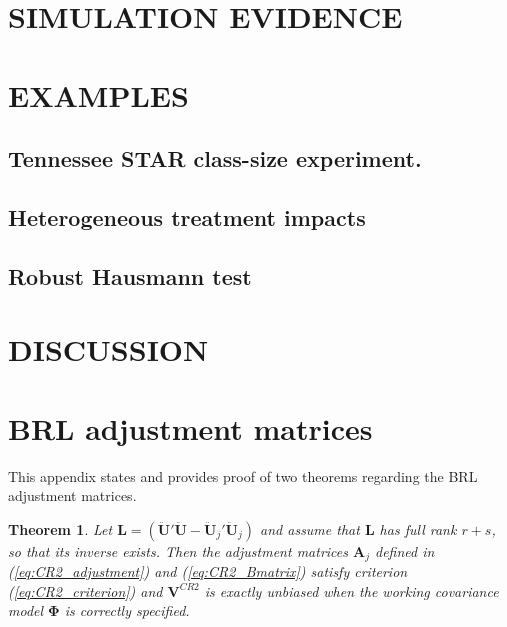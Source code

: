 \documentclass[12pt]{article}\usepackage[]{graphicx}\usepackage[]{color}
\newtheorem{thm}{Theorem}
\newcommand{\bm}{\mathbf}
\newcommand{\bs}{\boldsymbol}
\begin{document}
\section{SIMULATION EVIDENCE}
\label{subsec:simulations}

\section{EXAMPLES}
\label{subsec:examples_F}

\subsection{Tennessee STAR class-size experiment.} 

\subsection{Heterogeneous treatment impacts} 

\subsection{Robust Hausmann test} 

\section{DISCUSSION}
\label{sec:discussion}

\appendix

\section{BRL adjustment matrices}
\label{app:theorems}

This appendix states and provides proof of two theorems regarding the BRL adjustment matrices. 

\begin{thm}
\label{thm:BRL_FE}
Let $\bm{L} = \left(\bm{\ddot{U}}'\bm{\ddot{U}} - \bm{\ddot{U}}_j'\bm{\ddot{U}}_j\right)$ and assume that $\bm{L}$ has full rank $r + s$, so that its inverse exists. Then the adjustment matrices $\bm{A}_j$ defined in (\ref{eq:CR2_adjustment}) and (\ref{eq:CR2_Bmatrix}) satisfy criterion (\ref{eq:CR2_criterion}) and $\bm{V}^{CR2}$ is exactly unbiased when the working covariance model $\bs\Phi$ is correctly specified.
\end{thm}
\end{document}
